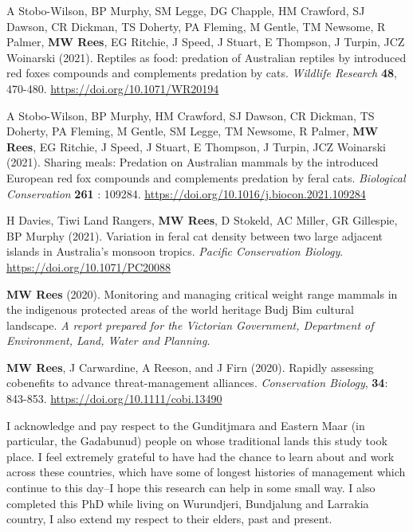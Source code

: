 \documentclass[11pt,a4paper,titlepage,twoside,openright]{style/unimelbthesis}
\begin{document}
\begin{frontmatter}
\begin{preface}
    A Stobo-Wilson, BP Murphy, SM Legge, DG Chapple, HM Crawford, SJ Dawson, CR Dickman, TS Doherty, PA Fleming, M Gentle, TM Newsome, R Palmer, \textbf{MW Rees}, EG Ritchie, J Speed, J Stuart, E Thompson, J Turpin, JCZ Woinarski (2021). Reptiles as food: predation of Australian reptiles by introduced red foxes compounds and complements predation by cats. \emph{Wildlife Research} \textbf{48}, 470-480. \url{https://doi.org/10.1071/WR20194}
    
    A Stobo-Wilson, BP Murphy, HM Crawford, SJ Dawson, CR Dickman, TS Doherty, PA Fleming, M Gentle, SM Legge, TM Newsome, R Palmer, \textbf{MW Rees}, EG Ritchie, J Speed, J Stuart, E Thompson, J Turpin, JCZ Woinarski (2021). Sharing meals: Predation on Australian mammals by the introduced European red fox compounds and complements predation by feral cats. \emph{Biological Conservation} \textbf{261} : 109284. \url{https://doi.org/10.1016/j.biocon.2021.109284}
    
    H Davies, Tiwi Land Rangers, \textbf{MW Rees}, D Stokeld, AC Miller, GR Gillespie, BP Murphy (2021). Variation in feral cat density between two large adjacent islands in Australia's monsoon tropics. \emph{Pacific Conservation Biology}. \url{https://doi.org/10.1071/PC20088}
    
    \textbf{MW Rees} (2020). Monitoring and managing critical weight range mammals in the indigenous protected areas of the world heritage Budj Bim cultural landscape. \emph{A report prepared for the Victorian Government, Department of Environment, Land, Water and Planning}.
    
    \textbf{MW Rees}, J Carwardine, A Reeson, and J Firn (2020). Rapidly assessing cobenefits to advance threat-management alliances. \emph{Conservation Biology}, \textbf{34}: 843-853. \url{https://doi.org/10.1111/cobi.13490}
  \end{preface}
  \begin{acknowledgements}
    I acknowledge and pay respect to the Gunditjmara and Eastern Maar (in particular, the Gadabunud) people on whose traditional lands this study took place. I feel extremely grateful to have had the chance to learn about and work across these countries, which have some of longest histories of management which continue to this day--I hope this research can help in some small way. I also completed this PhD while living on Wurundjeri, Bundjalung and Larrakia country, I also extend my respect to their elders, past and present.
    

\end{acknowledgements}
\end{frontmatter}
\end{document}
